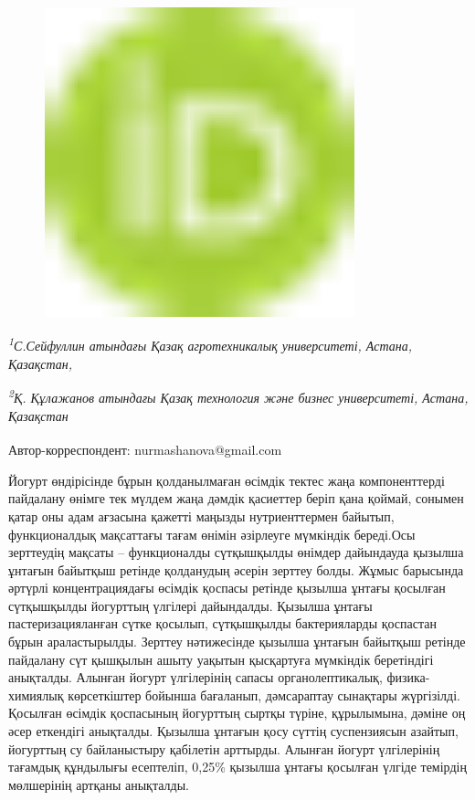 \begin{figure}[H]
	\centering
	\includegraphics[width=0.8\textwidth]{media/pish3/image1}
	\caption*{}
\end{figure}


\emph{\textsuperscript{1}С.Сейфуллин атындағы Қазақ агротехникалық
университеті, Астана, Қазақстан,}

\emph{\textsuperscript{2}Қ. Құлажанов атындағы Қазақ технология және
бизнес университеті, Астана, Қазақстан}

{\bfseries \textsuperscript{\envelope }}Автор-корреспондент: nurmashanova@gmail.com

Йогурт өндірісінде бұрын қолданылмаған өсімдік тектес жаңа
компоненттерді пайдалану өнімге тек мүлдем жаңа дәмдік қасиеттер беріп
қана қоймай, сонымен қатар оны адам ағзасына қажетті маңызды
нутриенттермен байытып, функционалдық мақсаттағы тағам өнімін әзірлеуге
мүмкіндік береді.Осы зерттеудің мақсаты -- функционалды сүтқышқылды
өнімдер дайындауда қызылша ұнтағын байытқыш ретінде қолданудың әсерін
зерттеу болды. Жұмыс барысында әртүрлі концентрациядағы өсімдік қоспасы
ретінде қызылша ұнтағы қосылған сүтқышқылды йогурттың үлгілері
дайындалды. Қызылша ұнтағы пастеризацияланған сүтке қосылып, сүтқышқылды
бактерияларды қоспастан бұрын араластырылды. Зерттеу нәтижесінде қызылша
ұнтағын байытқыш ретінде пайдалану сүт қышқылын ашыту уақытын қысқартуға
мүмкіндік беретіндігі анықталды. Алынған йогурт үлгілерінің сапасы
органолептикалық, физика-химиялық көрсеткіштер бойынша бағаланып,
дәмсараптау сынақтары жүргізілді. Қосылған өсімдік қоспасының йогурттың
сыртқы түріне, құрылымына, дәміне оң әсер еткендігі анықталды. Қызылша
ұнтағын қосу сүттің суспензиясын азайтып, йогурттың су байланыстыру
қабілетін арттырды. Алынған йогурт үлгілерінің тағамдық құндылығы
есептеліп, 0,25\% қызылша ұнтағы қосылған үлгіде темірдің мөлшерінің
артқаны анықталды.

